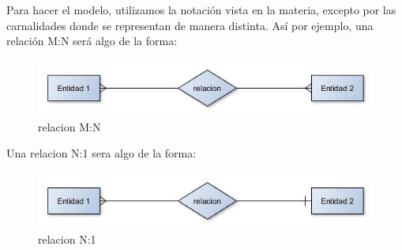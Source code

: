 Para hacer el modelo, utilizamos la notaci\'on vista en la materia, excepto por las carnalidades donde se representan de manera distinta. As\'i por ejemplo, una relaci\'on M:N ser\'a algo de la forma:

\begin{figure}[ht]
  \begin{center}
    \includegraphics[scale=.75]{./imagenes/ejrelacion.jpg}
    \caption{relacion M:N} 
    \label{fig:graficomn}
  \end{center}
\end{figure}

Una relacion N:1 sera algo de la forma:

\begin{figure}[ht]
  \begin{center}
    \includegraphics[scale=.75]{./imagenes/ejrelacion2.jpg}
    \caption{relacion N:1} 
    \label{fig:grafico}
  \end{center}
\end{figure}
